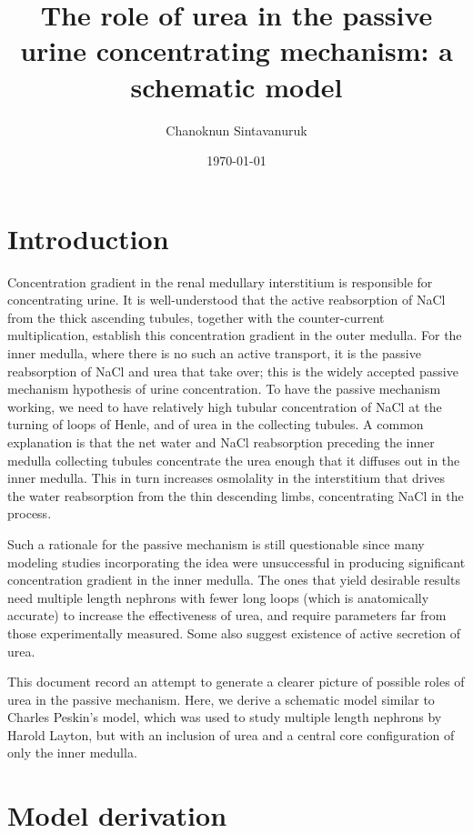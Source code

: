 \documentclass{article}
\title{The role of urea in the passive urine concentrating mechanism: a schematic model}
\author[1]{Chanoknun Sintavanuruk}
\date{\today}
\begin{document}
\sloppy %
\maketitle

\section{Introduction}

Concentration gradient in the renal medullary interstitium is responsible for concentrating urine.
It is well-understood that the active reabsorption of NaCl from the thick ascending tubules, together with the counter-current multiplication, establish this concentration gradient in the outer medulla.
For the inner medulla, where there is no such an active transport, it is the passive reabsorption of NaCl and urea that take over; this is the widely accepted passive mechanism hypothesis of urine concentration.
To have the passive mechanism working, we need to have relatively high tubular concentration of NaCl at the turning of loops of Henle, and of urea in the collecting tubules.
A common explanation is that the net water and NaCl reabsorption preceding the inner medulla collecting tubules concentrate the urea enough that it diffuses out in the inner medulla.
This in turn increases osmolality in the interstitium that drives the water reabsorption from the thin descending limbs, concentrating NaCl in the process.

Such a rationale for the passive mechanism is still questionable since many modeling studies incorporating the idea were unsuccessful in producing significant concentration gradient in the inner medulla.
The ones that yield desirable results need multiple length nephrons with fewer long loops (which is anatomically accurate) to increase the effectiveness of urea, and require parameters far from those experimentally measured.
Some also suggest existence of active secretion of urea.

This document record an attempt to generate a clearer picture of possible roles of urea in the passive mechanism.
Here, we derive a schematic model similar to Charles Peskin's model, which was used to study multiple length nephrons by Harold Layton, but with an inclusion of urea and a central core configuration of only the inner medulla.

\section{Model derivation}
\end{document}
